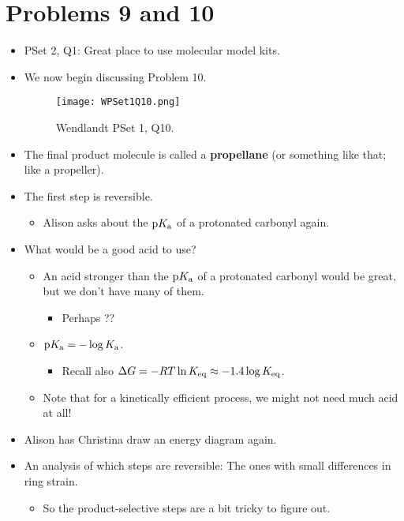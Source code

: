 \documentclass[../notes.tex]{subfiles}
\begin{document}
\section{Problems 9 and 10}
\begin{itemize}
    \item {}PSet 2, Q1: Great place to use molecular model kits.
    \item We now begin discussing Problem 10.
    \begin{figure}[h!]
        \centering
        \texttt{[image: WPSet1Q10.png]}
        \caption{Wendlandt PSet 1, Q10.}
        \label{fig:WPSet1Q10}
    \end{figure}
    \item The final product molecule is called a \textbf{propellane} (or something like that; like a propeller).
    \item The first step is reversible.
    \begin{itemize}
        \item Alison asks about the $\textup{p}K_\textup{a}$ of a protonated carbonyl again.
    \end{itemize}
    \item What would be a good acid to use?
    \begin{itemize}
        \item An acid stronger than the $\textup{p}K_\textup{a}$ of a protonated carbonyl would be great, but we don't have many of them.
        \begin{itemize}
            \item Perhaps ??
        \end{itemize}
        \item $\textup{p}K_\textup{a}=-\log K_\textup{a}$.
        \begin{itemize}
            \item Recall also $\Delta G=-RT\ln K_\textup{eq}\approx-1.4\log K_\textup{eq}$.
        \end{itemize}
        \item Note that for a kinetically efficient process, we might not need much acid at all!
    \end{itemize}
    \item Alison has Christina draw an energy diagram again.
    \item An analysis of which steps are reversible: The ones with small differences in ring strain.
    \begin{itemize}
        \item So the product-selective steps are a bit tricky to figure out.

\end{itemize}
\end{itemize}
\end{document}

